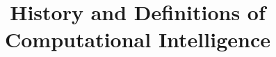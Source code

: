 \title{History and Definitions of Computational Intelligence}
\author{}
\institute{}
\maketitle
\label{chp:history}
\label{chp:definitions}
